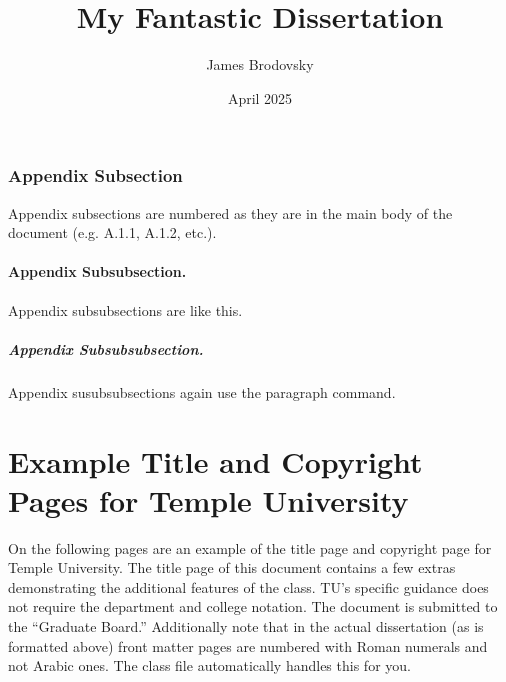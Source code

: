 \documentclass{thesis-dissertation}
\begin{document}
\subsection{Appendix Subsection}
Appendix subsections are numbered as they are in the main body of the document (e.g. A.1.1, A.1.2, etc.).
\subsubsection{Appendix Subsubsection.}
Appendix subsubsections are like this.
\paragraph{Appendix Subsubsubsection.}
Appendix susubsubsections again use the paragraph command.

\chapter{Example Title and Copyright Pages for Temple University}
\label{app:example-title-page}
On the following pages are an example of the title page and copyright page for Temple University. The title page of this document contains a few extras demonstrating the additional features of the class. TU's specific guidance does not require the department and college notation. The document is submitted to the ``Graduate Board.'' Additionally note that in the actual dissertation (as is formatted above) front matter pages are numbered with Roman numerals and not Arabic ones. The class file automatically handles this for you.

\newpage{}
\title{My Fantastic Dissertation}
\author{James Brodovsky}        %
\date{April 2025}               %
\department{\relax} %
\school{\relax}  %

\maketitlepage{}
\end{document}
